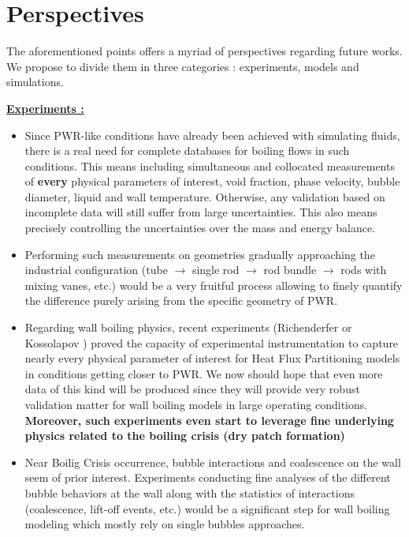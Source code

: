 \section{Perspectives}

The aforementioned points offers a myriad of perspectives regarding future works. We propose to divide them in three categories : experiments, models and simulations.

\npar

\textbf{\underline{Experiments :}}

\begin{itemize}
\item Since PWR-like conditions have already been achieved with simulating fluids, there is a real need for complete databases for boiling flows in such conditions. This means including simultaneous and collocated measurements of \textbf{every} physical parameters of interest, \ie void fraction, phase velocity, bubble diameter, liquid and wall temperature. Otherwise, any validation based on incomplete data will still suffer from large uncertainties. This also means precisely controlling the uncertainties over the mass and energy balance.

\item Performing such measurements on geometries gradually approaching the industrial configuration (\eg tube $\rightarrow$ single rod $\rightarrow$ rod bundle $\rightarrow$ rods with mixing vanes, etc.) would be a very fruitful process allowing to finely quantify the difference purely arising from the specific geometry of PWR.

\item Regarding wall boiling physics, recent experiments (\eg Richenderfer \cite{richenderfer_experimental_2018} or Kossolapov \cite{kossolapov_experimental_2021}) proved the capacity of experimental instrumentation to capture nearly every physical parameter of interest for Heat Flux Partitioning models in conditions getting closer to PWR. We now should hope that even more data of this kind will be produced since they will provide very robust validation matter for wall boiling models in large operating conditions. \textbf{Moreover, such experiments even start to leverage fine underlying physics related to the boiling crisis (\eg dry patch formation)}

\item Near Boilig Crisis occurrence, bubble interactions and coalescence on the wall seem of prior interest. Experiments conducting fine analyses of the different bubble behaviors at the wall along with the statistics of interactions (coalescence, lift-off events, etc.) would be a significant step for wall boiling modeling which mostly rely on single bubbles approaches.


\end{itemize}
